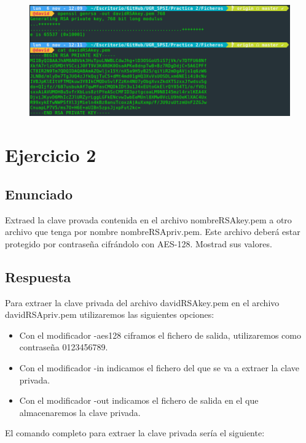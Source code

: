 \documentclass[10pt,a4paper,spanish]{report}
\begin{document}
\begin{figure}[!hbp]
 \centering  \includegraphics[width=1\textwidth]{./Imagenes/1.png}
\end{figure}


\chapter{Ejercicio 2}

\section{Enunciado}
\noindent
Extraed la clave provada contenida en el archivo nombreRSAkey.pem a otro archivo que tenga por nombre nombreRSApriv.pem. Este archivo deberá estar protegido por contraseña cifrándolo con AES-128. Mostrad sus valores.

\section{Respuesta}
\noindent
Para extraer la clave privada del archivo davidRSAkey.pem en el archivo davidRSApriv.pem utilizaremos las siguientes opciones:

\begin{itemize}
 \item Con el modificador -aes128 ciframos el fichero de salida, utilizaremos como contraseña 0123456789.
 \item Con el modificador -in indicamos el fichero del que se va a extraer la clave privada.
 \item Con el modificador -out indicamos el fichero de salida en el que almacenaremos la clave privada.
\end{itemize}

\noindent
El comando completo para extraer la clave privada sería el siguiente:
\end{document}
